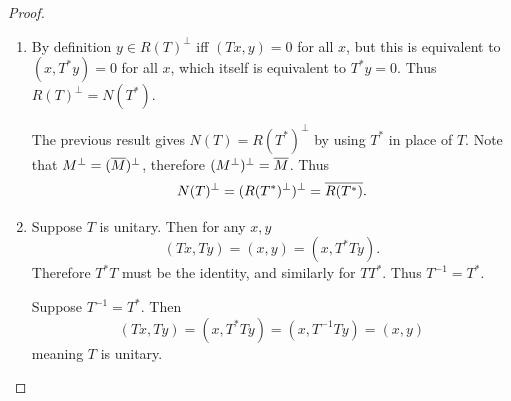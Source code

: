 \documentclass[hw_all.tex]{subfiles}
\begin{document}
\begin{proof}
\begin{enumerate}
            The reverse inequality from the very beginning can now be proven since the same argument can be used to get $\norm{T^{**}} \leq \norm{T^*}$, and $T^{**} = T$ meaning $\norm{T} \leq \norm{T^*}$. Therefore $\norm{T} = \norm{T^*}$.

        \item 
            By definition $y \in R(T)^\perp$ iff $(Tx, y) = 0$ for all $x$, but this is equivalent to $(x, T^* y) = 0$ for all $x$, which itself is equivalent to $T^* y = 0$. Thus $R(T)^\perp = N(T^*)$.

            The previous result gives $N(T) = R(T^*)^\perp$ by using $T^*$ in place of $T$. Note that $M^\perp = (\overline{M})^\perp$, therefore $(M^\perp)^\perp = \overline{M}$. Thus
            \[
                N(T)^\perp = (R(T^*)^\perp)^\perp = \overline{R(T^*)}
            .\]

        \item 
            Suppose $T$ is unitary. Then for any $x,y$
            \[
                (Tx, Ty) = (x, y) = (x, T^* Ty)
            .\]
            Therefore $T^* T$ must be the identity, and similarly for $T T^*$. Thus $T^{-1} = T^*$.

            Suppose $T^{-1} = T^*$. Then
            \[
                (Tx, Ty) = (x, T^* T y) = (x, T^{-1} T y) = (x,y)
            \]
            meaning $T$ is unitary.
    \end{enumerate}
\end{proof}
\end{document}
